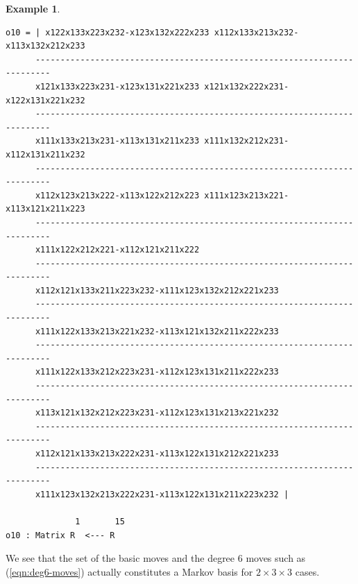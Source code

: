 \documentclass[12pt]{article}
\theoremstyle{definition}
\newtheorem{Example}[Theorem]{Example}
\begin{document}
\begin{Example}
{\begin{verbatim}
o10 = | x122x133x223x232-x123x132x222x233 x112x133x213x232-x113x132x212x233
      -------------------------------------------------------------------------
      x121x133x223x231-x123x131x221x233 x121x132x222x231-x122x131x221x232
      -------------------------------------------------------------------------
      x111x133x213x231-x113x131x211x233 x111x132x212x231-x112x131x211x232
      -------------------------------------------------------------------------
      x112x123x213x222-x113x122x212x223 x111x123x213x221-x113x121x211x223
      -------------------------------------------------------------------------
      x111x122x212x221-x112x121x211x222
      -------------------------------------------------------------------------
      x112x121x133x211x223x232-x111x123x132x212x221x233
      -------------------------------------------------------------------------
      x111x122x133x213x221x232-x113x121x132x211x222x233
      -------------------------------------------------------------------------
      x111x122x133x212x223x231-x112x123x131x211x222x233
      -------------------------------------------------------------------------
      x113x121x132x212x223x231-x112x123x131x213x221x232
      -------------------------------------------------------------------------
      x112x121x133x213x222x231-x113x122x131x212x221x233
      -------------------------------------------------------------------------
      x111x123x132x213x222x231-x113x122x131x211x223x232 |

              1       15
o10 : Matrix R  <--- R
\end{verbatim}
}
We see that the set of the basic moves and the degree $6$ moves such as
 (\ref{eqn:deg6-moves}) actually constitutes a Markov basis for $2\times
 3\times 3$ cases. 


\end{Example}
\end{document}
